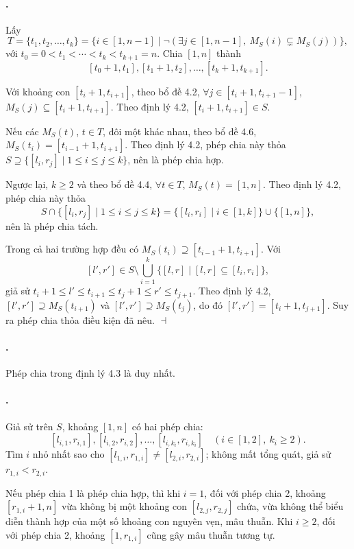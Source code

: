 \documentclass[11pt]{article}
\providecommand{\square}{\dashv}
\begin{document}
\paragraph{.}
Lấy
\[
  T=\{t_1,t_2,\ldots,t_k\}
  =\{i\in[1,n-1]\mid
  \neg(\exists j\in[1,n-1],\ M_S(i)\subsetneq M_S(j))\},
\]
với $t_0=0<t_1<\cdots<t_k<t_{k+1}=n$. Chia $[1,n]$ thành
\[
  [t_0+1,t_1], [t_1+1,t_2], \ldots, [t_k+1,t_{k+1}].
\]

Với khoảng con $[t_i+1,t_{i+1}]$, theo bổ đề 4.2,
$\forall j\in[t_i+1,t_{i+1}-1]$, $M_S(j)\subseteq[t_i+1,t_{i+1}]$. Theo định
lý 4.2, $[t_i+1,t_{i+1}]\in S$.

Nếu các $M_S(t)$, $t\in T$, đôi một khác nhau, theo bổ đề 4.6,
$M_S(t_i)=[t_{i-1}+1,t_{i+1}]$. Theo định lý 4.2, phép chia này thỏa
$S\supseteq\{[l_i,r_j]\mid 1\le i\le j\le k\}$, nên là phép chia hợp.

Ngược lại, $k\ge2$ và theo bổ đề 4.4, $\forall t\in T$, $M_S(t)=[1,n]$. Theo
định lý 4.2, phép chia này thỏa
\[
  S\cap\{[l_i,r_j]\mid 1\le i\le j\le k\}
  =\{[l_i,r_i]\mid i\in[1,k]\}\cup\{[1,n]\},
\]
nên là phép chia tách.

Trong cả hai trường hợp đều có
$M_S(t_i)\supseteq[t_{i-1}+1,t_{i+1}]$. Với
\[
  [l',r']\in S\setminus
  \bigcup_{i=1}^k \{[l,r]\mid [l,r]\subseteq[l_i,r_i]\},
\]
giả sử $t_i+1\le l'\le t_{i+1}\le t_j+1\le r'\le t_{j+1}$. Theo định lý 4.2,
$[l',r']\supseteq M_S(t_{i+1})$ và $[l',r']\supseteq M_S(t_j)$, do đó
$[l',r']=[t_i+1,t_{j+1}]$. Suy ra phép chia thỏa điều kiện đã nêu.
\hfill$\square$

\paragraph{.}
Phép chia trong định lý 4.3 là duy nhất.

\paragraph{.}
Giả sử trên $S$, khoảng $[1,n]$ có hai phép chia:
\[
  [l_{i,1},r_{i,1}], [l_{i,2},r_{i,2}],\ldots,[l_{i,k_i},r_{i,k_i}]
  \quad (i\in[1,2],\ k_i\ge2).
\]
Tìm $i$ nhỏ nhất sao cho $[l_{1,i},r_{1,i}]\ne[l_{2,i},r_{2,i}]$; không mất
tổng quát, giả sử $r_{1,i}<r_{2,i}$.

Nếu phép chia 1 là phép chia hợp, thì khi $i=1$, đối với phép chia 2, khoảng
$[r_{1,i}+1,n]$ vừa không bị một khoảng con $[l_{2,j},r_{2,j}]$ chứa, vừa
không thể biểu diễn thành hợp của một số khoảng con nguyên vẹn, mâu thuẫn. Khi
$i\ge2$, đối với phép chia 2, khoảng $[1,r_{1,i}]$ cũng gây mâu thuẫn tương tự.
\end{document}
